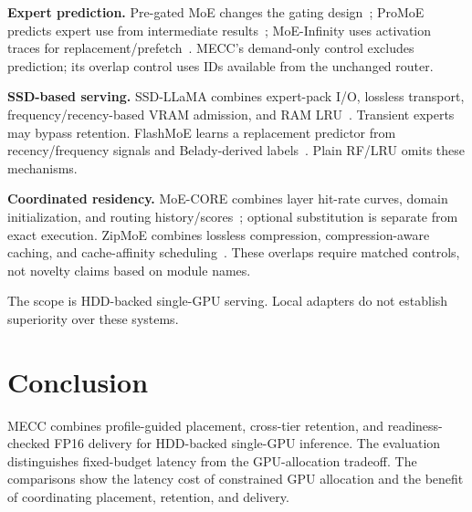 \documentclass[conference,9pt,letterpaper]{IEEEtran}
\newcommand{\mecc}{\textsc{MECC}}
\begin{document}
\textbf{Expert prediction.} Pre-gated MoE changes the gating design~\cite{pregated}; ProMoE predicts expert use from intermediate results~\cite{promoe}; MoE-Infinity uses activation traces for replacement/prefetch~\cite{moeinfinity}. MECC's demand-only control excludes prediction; its overlap control uses IDs available from the unchanged router.

\textbf{SSD-based serving.} SSD-LLaMA combines expert-pack I/O, lossless transport, frequency/recency-based VRAM admission, and RAM LRU~\cite{ssdllama}. Transient experts may bypass retention. FlashMoE learns a replacement predictor from recency/frequency signals and Belady-derived labels~\cite{flashmoe}. Plain RF/LRU omits these mechanisms.

\textbf{Coordinated residency.} MoE-CORE combines layer hit-rate curves, domain initialization, and routing history/scores~\cite{core}; optional substitution is separate from exact execution. ZipMoE combines lossless compression, compression-aware caching, and cache-affinity scheduling~\cite{zipmoe}. These overlaps require matched controls, not novelty claims based on module names.

The scope is HDD-backed single-GPU serving. Local adapters do not establish superiority over these systems.

\section{Conclusion}
\mecc{} combines profile-guided placement, cross-tier retention, and readiness-checked FP16 delivery for HDD-backed single-GPU inference. The evaluation distinguishes fixed-budget latency from the GPU-allocation tradeoff. The comparisons show the latency cost of constrained GPU allocation and the benefit of coordinating placement, retention, and delivery.

\clearpage
\nobalance
{}


\end{document}
